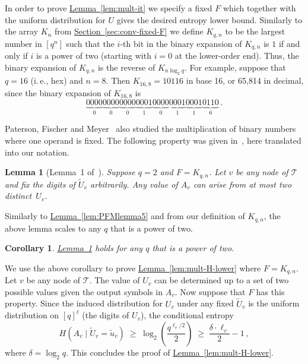 \documentclass[11pt]{article}
\numberwithin{equation}{section}
\newtheorem{lemma}[theorem]{Lemma}
\newtheorem{corollary}[theorem]{Corollary}
\theoremstyle{definition}
\theoremstyle{plain}
\newcommand{\ie}{i.\,e.}
\newcommand{\expref}[2]{\hyperref[#2]{#1~\ref{#2}}}
\newcommand{\calT}{\ensuremath{\mathcal{T}}}
\newcommand{\Xv}{\ensuremath{U_v}}
\newcommand{\Xvknown}{\ensuremath{\widetilde{U}_v}}
\newcommand{\Xvfix}{\ensuremath{\widetilde{u}_v}}
\newcommand{\Yv}{\ensuremath{A_v}}
\begin{document}
In order to prove \expref{Lemma}{lem:mult-it} we specify a fixed $F$ which together with the uniform distribution for $U$ gives the desired entropy lower bound.
Similarly to the array $K_n$ from \expref{Section}{sec:conv-fixed-F} we define $K_{q,n}$ to be the largest number in $[q^n]$ such that the $i$-th bit in the binary expansion of $K_{q,n}$ is $1$ if and only if $i$ is a power of two (starting with $i=0$ at the lower-order end). Thus, the binary expansion of $K_{q,n}$ is the reverse of $K_{n\log_2 q}$.
For example, suppose that $q=16$ (\ie, hex) and $n=8$. Then $K_{16,8}=10116$ in base 16, or 65,814 in decimal, since the binary expansion of $K_{16,8}$ is
\[
\underbrace{0000}_{0}
\underbrace{0000}_{0}
\underbrace{0000}_{0}
\underbrace{0001}_{1}
\underbrace{0000}_{0}
\underbrace{0001}_{1}
\underbrace{0001}_{1}
\underbrace{0110}_{6}\,.
\]

Paterson, Fischer and Meyer~\cite{PFM:1974} also studied the multiplication of binary numbers where one operand is fixed. The following property was given in~\cite{PFM:1974}, here translated into our notation.

\begin{lemma}[Lemma~1 of~\cite{PFM:1974}]
	\label{lem:PFMlemma1}
	Suppose $q=2$ and $F=K_{q,n}$. Let $v$ be any node of $\calT$ and fix the digits of $\Xvknown$ arbitrarily. Any value of $A_v$ can arise from at most two distinct~$\Xv$.
\end{lemma}

Similarly to \expref{Lemma}{lem:PFMlemma5} and from our definition of $K_{q,n}$, the above lemma scales to any $q$ that is a power of two.

\begin{corollary}
	\expref{Lemma}{lem:PFMlemma1} holds for any $q$ that is a power of two.
\end{corollary}

We use the above corollary to prove \expref{Lemma}{lem:mult-H-lower} where $F=K_{q,n}$.
Let $v$ be any node of $\calT$.
The value of $\Xv$ can be determined up to a set of two possible values given the output symbols in $\Yv$. Now suppose that $F$ has this property.
Since the induced distribution for $\Xv$ under any fixed $\Xvknown$ is the uniform distribution on $[q]^\ell$ (the digits of $\Xv$), the conditional entropy
\[
H(\Yv\mid\Xvknown=\Xvfix)
\;\geq\;
\log_2 \left(\frac{q^{\ell_v / 2}}{2}\right)
\;\geq\;
\frac{\delta \cdot \ell_v}{2} - 1\,,
\]
where $\delta=\log_2 q$.
This concludes the proof of \expref{Lemma}{lem:mult-H-lower}.
\end{document}
